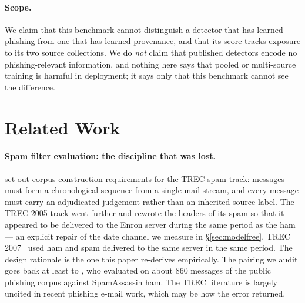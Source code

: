 \documentclass[twoside,11pt]{article}
\begin{document}
\paragraph{Scope.}
We claim that this benchmark cannot distinguish a detector that has learned
phishing from one that has learned provenance, and that its score tracks
exposure to its two source collections. We do \emph{not} claim that published
detectors encode no phishing-relevant information, and nothing here says that
pooled or multi-source training is harmful in deployment; it says only that
this benchmark cannot see the difference.

\section{Related Work}

\paragraph{Spam filter evaluation: the discipline that was lost.}
\citet{cormack2005} set out corpus-construction requirements
for the TREC spam track: messages must form a chronological sequence from a
single mail stream, and every message must carry an adjudicated judgement
rather than an inherited source label. The TREC 2005 track went further and
rewrote the headers of its spam so that it appeared to be delivered to the
Enron server during the same period as the ham~\citep{cormack2005trec} --- an
explicit repair of the date channel we measure in \S\ref{sec:modelfree}. TREC
2007~\citep{cormack2007} used ham and spam delivered to the same server in the
same period. The design rationale is the one this paper re-derives
empirically. The pairing we audit goes back at least to \citet{fette2007learning}, who evaluated on about 860 messages of the
public phishing corpus against SpamAssassin ham. The TREC literature is
largely uncited in recent phishing e-mail work, which may be how the error
returned.
\end{document}
